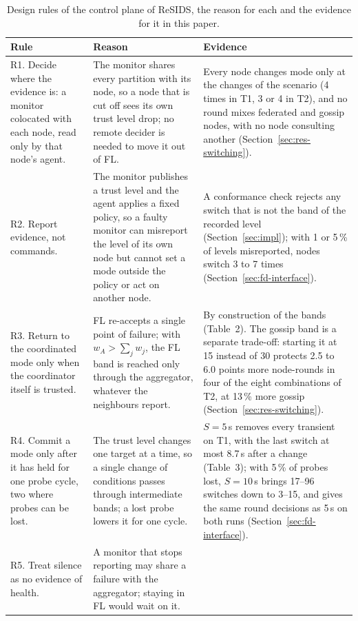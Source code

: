\begin{table}[t]
\caption{Design rules of the control plane of ReSIDS, the reason for each and the evidence for it in this paper.}
\label{tab:design-rules}
\small
\begin{tabular}{@{}p{}p{}p{}@{}}
\toprule
Rule & Reason & Evidence \\
\midrule
R1. Decide where the evidence is: a monitor colocated with each node, read only by that node's agent. &
The monitor shares every partition with its node, so a node that is cut off sees its own trust level drop; no remote decider is needed to move it out of FL. &
Every node changes mode only at the changes of the scenario (4 times in T1, 3 or 4 in T2), and no round mixes federated and gossip nodes, with no node consulting another (Section~\ref{sec:res-switching}). \\
R2. Report evidence, not commands. &
The monitor publishes a trust level and the agent applies a fixed policy, so a faulty monitor can misreport the level of its own node but cannot set a mode outside the policy or act on another node. &
A conformance check rejects any switch that is not the band of the recorded level (Section~\ref{sec:impl}); with 1 or 5\,\% of levels misreported, nodes switch 3 to 7 times (Section~\ref{sec:fd-interface}). \\
R3. Return to the coordinated mode only when the coordinator itself is trusted. &
FL re-accepts a single point of failure; with $w_A>\sum_j w_j$, the FL band is reached only through the aggregator, whatever the neighbours report. &
By construction of the bands (Table~2). The gossip band is a separate trade-off: starting it at 15 instead of 30 protects 2.5 to 6.0 points more node-rounds in four of the eight combinations of T2, at 13\,\% more gossip (Section~\ref{sec:res-switching}). \\
R4. Commit a mode only after it has held for one probe cycle, two where probes can be lost. &
The trust level changes one target at a time, so a single change of conditions passes through intermediate bands; a lost probe lowers it for one cycle. &
$S=5$\,s removes every transient on T1, with the last switch at most 8.7\,s after a change (Table~3); with 5\,\% of probes lost, $S=10$\,s brings 17--96 switches down to 3--15, and gives the same round decisions as 5\,s on both runs (Section~\ref{sec:fd-interface}). \\
R5. Treat silence as no evidence of health. &
A monitor that stops reporting may share a failure with the aggregator; staying in FL would wait on it. &

\end{tabular}
\end{table}
